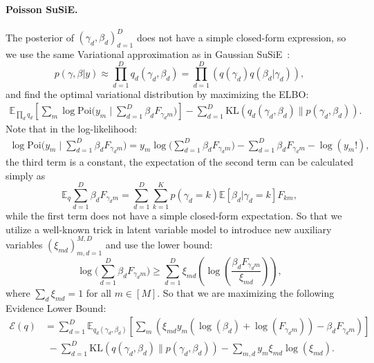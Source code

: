 \documentclass[11pt,twoside]{article}
\newcommand{\Ebb}{\ensuremath{\mathbb{E}}}
\theoremstyle{plain}
\numberwithin{theorem}{section}
\numberwithin{proposition}{section}
\numberwithin{lemma}{section}
\numberwithin{definition}{section}
\numberwithin{condition}{section}
\numberwithin{problem}{section}
\numberwithin{corollary}{section}
\numberwithin{assumption}{section}
\numberwithin{example}{section}
\numberwithin{conjecture}{section}
\theoremstyle{definition}
\numberwithin{remark}{section}
\begin{document}
\paragraph{Poisson SuSiE.} The posterior of $(\gamma_{d}, \beta_{d})_{d = 1}^{D}$ does not have a simple closed-form expression, so we use the same Variational approximation as in Gaussian SuSiE~\cite{Wang2020-cr}:
\begin{equation}
    p(\gamma, \beta | y) \approx \prod_{d = 1}^{D} q_d(\gamma_d, \beta_d) = \prod_{d = 1}^{D} (q(\gamma_d) q(\beta_d | \gamma_d)),
\end{equation}
and find the optimal variational distribution by maximizing the ELBO:
\begin{align*}
\Ebb_{\prod_d q_d} \left[\sum_{m} \log \mathrm{Poi} \bigg(y_m \mid \sum_{d=1}^{D} \beta_d F_{\gamma_d m}\bigg)\right] - \sum_{d=1}^{D} \mathrm{KL}(q_d(\gamma_d, \beta_d) \| p(\gamma_d, \beta_d)). 
\end{align*}
Note that in the log-likelihood: 
\begin{align*}
    \log \mathrm{Poi} \bigg(y_m \mid \sum_{d=1}^{D} \beta_d F_{\gamma_d m}\bigg) = y_m \log\bigg(\sum_{d=1}^{D} \beta_d F_{\gamma_d m}\bigg) -  \sum_{d=1}^{D} \beta_d F_{\gamma_d m} - \log (y_m!),
\end{align*}
the third term is a constant, the expectation of the second term can be calculated simply as
\begin{equation}
\Ebb_q \sum_{d=1}^{D} \beta_d F_{\gamma_d m} = \sum_{d=1}^{D} \sum_{k=1}^{K} p(\gamma_d = k)  \Ebb [\beta_d | \gamma_d = k] F_{km},
\end{equation}
while the first term does not have a simple closed-form expectation. So that we utilize a well-known trick in latent variable model to introduce new auxiliary variables $(\xi_{md})_{m, d=1}^{M, D}$ and use the lower bound:
\begin{equation}
\log\bigg(\sum_{d=1}^{D} \beta_d F_{\gamma_d m}\bigg) \geq \sum_{d=1}^{D} \xi_{md} \left(\log \left(\dfrac{\beta_d F_{\gamma_d m}}{\xi_{md}}\right) \right),
\end{equation}
where $\sum_{d} \xi_{md} = 1$ for all $m\in [M]$. 
So that we are maximizing the following Evidence Lower Bound:
\begin{align}
\mathcal{E}(q) & = \sum_{d=1}^{D} \Ebb_{q_d(\gamma_d, \beta_d)} \left[\sum_m \left(\xi_{md} y_m (\log(\beta_d) + \log(F_{\gamma_d m})) - \beta_d F_{\gamma_d m} \right)\right] \nonumber \\
& \,\, - \sum_{d=1}^{D}  \mathrm{KL}(q(\gamma_d, \beta_d)\| p(\gamma_d, \beta_d)) - \sum_{m, d} y_m \xi_{md} \log(\xi_{md}).  
\end{align}
\end{document}
